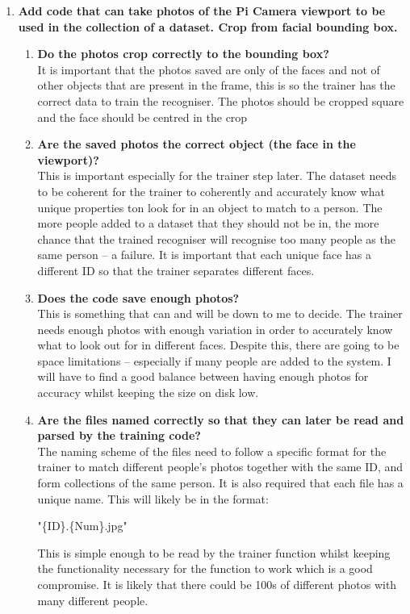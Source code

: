 \documentclass[9pt]{article}
\newenvironment{tightcenter}{%
	\setlength\topsep{2pt}%
	\setlength\parskip{3pt}%
	\par\centering}{\par\noindent\ignorespacesafterend}
\begin{document}
\begin{small}
\begin{enumerate}
		\item \textbf{Add code that can take photos of the Pi Camera viewport to be used in the collection of a dataset. Crop from facial bounding box.}
		\begin{enumerate}
			\item \textbf{Do the photos crop correctly to the bounding box?}\\
				It is important that the photos saved are only of the faces and not of other objects that are present in the frame, this is so the trainer has the correct data to train the recogniser. The photos should be cropped square and the face should be centred in the crop
			\item \textbf{Are the saved photos the correct object (the face in the viewport)?}\\
				This is important especially for the trainer step later. The dataset needs to be coherent for the trainer to coherently and accurately know what unique properties ton look for in an object to match to a person. The more people added to a dataset that they should not be in, the more chance that the trained recogniser will recognise too many people as the same person – a failure. It is important that each unique face has a different ID so that the trainer separates different faces.
		\item \textbf{Does the code save enough photos?}\\
				This is something that can and will be down to me to decide. The trainer needs enough photos with enough variation in order to accurately know what to look out for in different faces. Despite this, there are going to be space limitations – especially if many people are added to the system. I will have to find a good balance between having enough photos for accuracy whilst keeping the size on disk low.
		\item \textbf{Are the files named correctly so that they can later be read and parsed by the training code?}\\
				The naming scheme of the files need to follow a specific format for the trainer to match different people’s photos together with the same ID, and form collections of the same person. It is also required that each file has a unique name. This will likely be in the format:
				\begin{tightcenter}
					{"\{ID\}.\{Num\}.jpg"}
				\end{tightcenter}
				This is simple enough to be read by the trainer function whilst keeping the functionality necessary for the function to work which is a good compromise. It is likely that there could be 100s of different photos with many different people.
		\end{enumerate}
		

\end{enumerate}
\end{small}
\end{document}
